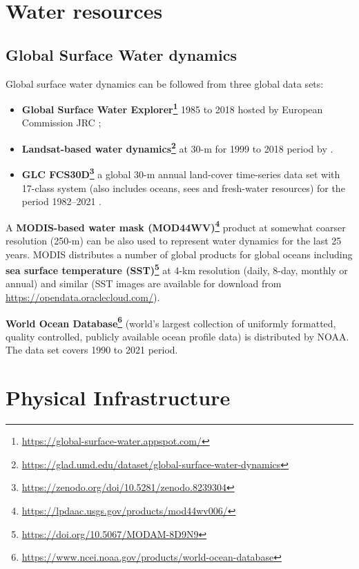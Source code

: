 \documentclass[
  graybox,natbib,nospthms]{svmono}
\providecommand{\tightlist}{%
  \setlength{\itemsep}{0pt}\setlength{\parskip}{0pt}}
\providecommand{\tightlist}{\setlength{\itemsep}{0pt}\setlength{\parskip}{0pt}}
\renewcommand{\href}[2]{#2 (\url{#1})}
\renewcommand{\href}[2]{#2\footnote{\url{#1}}}
\begin{document}
\hypertarget{water-resources}{%
\section{Water resources}\label{water-resources}}

\hypertarget{global-surface-water-dynamics}{%
\subsection{Global Surface Water dynamics}\label{global-surface-water-dynamics}}

Global surface water dynamics can be followed from three global data sets:

\begin{itemize}
\tightlist
\item
  \textbf{\href{https://global-surface-water.appspot.com/}{Global Surface Water Explorer}} 1985 to 2018 hosted by European Commission JRC
  \citep{Pekel2016};
\item
  \textbf{\href{https://glad.umd.edu/dataset/global-surface-water-dynamics}{Landsat-based water dynamics}} at 30-m for 1999 to 2018 period by \citet{pickens2020mapping}.
\item
  \textbf{\href{https://zenodo.org/doi/10.5281/zenodo.8239304}{GLC FCS30D}} a global 30-m annual land-cover time-series data set with 17-class system (also includes oceans, sees and fresh-water resources) for the period 1982--2021 \citep{Zhang2021}.
\end{itemize}

A \textbf{\href{https://lpdaac.usgs.gov/products/mod44wv006/}{MODIS-based water mask (MOD44WV)}} product at somewhat
coarser resolution (250-m) can be also used to represent water dynamics for the last 25 years.
MODIS distributes a number of global products for global oceans including \textbf{\href{https://doi.org/10.5067/MODAM-8D9N9}{sea surface temperature (SST)}}
at 4-km resolution (daily, 8-day, monthly or annual) and similar (SST images are available for download from \url{https://opendata.oraclecloud.com/}).

\textbf{\href{https://www.ncei.noaa.gov/products/world-ocean-database}{World Ocean Database}} (world's largest collection of uniformly formatted, quality controlled, publicly available ocean profile data) is distributed by NOAA.
The data set covers 1990 to 2021 period.

\hypertarget{physical-infrastructure}{%
\section{Physical Infrastructure}\label{physical-infrastructure}}
\end{document}

